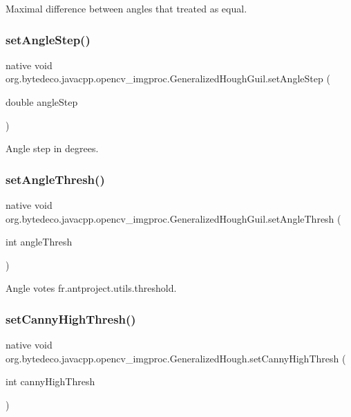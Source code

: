 Maximal difference between angles that treated as equal. \mbox{\label{group__imgproc_ga68165aad724a0130724caaa5cbe49aeb}} 
\subsubsection{\texorpdfstring{set\+Angle\+Step()}{setAngleStep()}}
{\footnotesize\ttfamily native void org.\+bytedeco.\+javacpp.\+opencv\+\_\+imgproc.\+Generalized\+Hough\+Guil.\+set\+Angle\+Step (\begin{DoxyParamCaption}\item[{double}]{angle\+Step }\end{DoxyParamCaption})}

Angle step in degrees. \mbox{\label{group__imgproc_gaeba2e2313c8d860e626dd7225d07fca3}} 
\subsubsection{\texorpdfstring{set\+Angle\+Thresh()}{setAngleThresh()}}
{\footnotesize\ttfamily native void org.\+bytedeco.\+javacpp.\+opencv\+\_\+imgproc.\+Generalized\+Hough\+Guil.\+set\+Angle\+Thresh (\begin{DoxyParamCaption}\item[{int}]{angle\+Thresh }\end{DoxyParamCaption})}

Angle votes fr.antproject.utils.threshold. \mbox{\label{group__imgproc_gaa001df9ff64a9ea3e521e5218702134f}}
\subsubsection{\texorpdfstring{set\+Canny\+High\+Thresh()}{setCannyHighThresh()}}
{\footnotesize\ttfamily native void org.\+bytedeco.\+javacpp.\+opencv\+\_\+imgproc.\+Generalized\+Hough.\+set\+Canny\+High\+Thresh (\begin{DoxyParamCaption}\item[{int}]{canny\+High\+Thresh }\end{DoxyParamCaption})}

